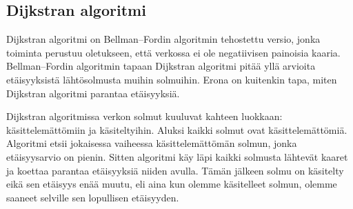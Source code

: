 \subsection{Dijkstran algoritmi}

Dijkstran algoritmi on Bellman–Fordin algoritmin tehostettu versio,
jonka toiminta perustuu oletukseen, että verkossa ei ole
negatiivisen painoisia kaaria.
Bellman–Fordin algoritmin tapaan Dijkstran algoritmi pitää
yllä arvioita etäisyyksistä lähtösolmusta muihin solmuihin.
Erona on kuitenkin tapa, miten Dijkstran algoritmi parantaa etäisyyksiä.

Dijkstran algoritmissa verkon solmut kuuluvat kahteen luokkaan:
käsitte\-lemättömiin ja käsiteltyihin.
Aluksi kaikki solmut ovat käsittelemättömiä.
Algoritmi etsii jokaisessa vaiheessa käsittelemättömän solmun,
jonka etäisyys\-arvio on pienin.
Sitten algoritmi käy läpi kaikki solmusta lähtevät kaaret ja
koettaa parantaa etäisyyksiä niiden avulla.
Tämän jälkeen solmu on käsitelty eikä sen etäisyys enää muutu,
eli aina kun olemme käsitelleet solmun,
olemme saaneet selville sen lopullisen etäisyyden.

